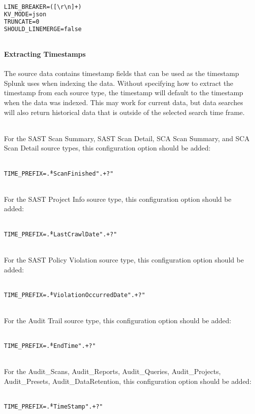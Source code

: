 \begin{lstlisting}[caption={Log4Net Record File Appenders}, label={lst:sourcetypes}, language=XML]
LINE_BREAKER=([\r\n]+)
KV_MODE=json
TRUNCATE=0
SHOULD_LINEMERGE=false
\end{lstlisting}

\noindent\\\textbf{Extracting Timestamps}\\

\noindent\\The source data contains timestamp fields that can be used as the timestamp Splunk uses when indexing the data.  Without specifying how to extract the
timestamp from each source type, the timestamp will default to the timestamp when the data was indexed.  This may work for current data, but data searches 
will also return historical data that is outside of the selected search time frame.

\noindent\\For the SAST Scan Summary, SAST Scan Detail, SCA Scan Summary, and SCA Scan Detail source types, this configuration option should be added:

\noindent\\\texttt{TIME\_PREFIX=\^.*ScanFinished".+?"}

\noindent\\For the SAST Project Info source type, this configuration option should be added:

\noindent\\\texttt{TIME\_PREFIX=\^.*LastCrawlDate".+?"}

\noindent\\For the SAST Policy Violation source type, this configuration option should be added:

\noindent\\\texttt{TIME\_PREFIX=\^.*ViolationOccurredDate".+?"}

\noindent\\For the Audit Trail source type, this configuration option should be added:

\noindent\\\texttt{TIME\_PREFIX=\^.*EndTime".+?"}

\noindent\\For the Audit\_Scans, Audit\_Reports, Audit\_Queries, Audit\_Projects, Audit\_Presets, Audit\_DataRetention, this configuration option should be added:

\noindent\\\texttt{TIME\_PREFIX=\^.*TimeStamp".+?"}



